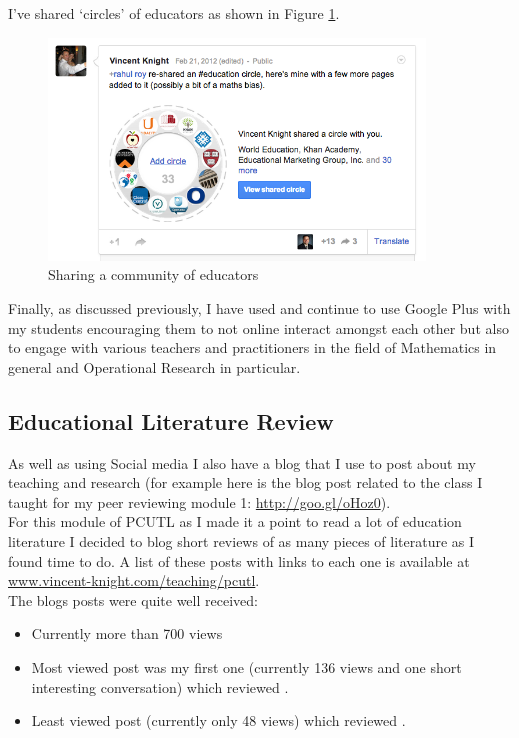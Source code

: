 \documentclass[a4paper,12pt]{article}
\begin{document}
I've shared `circles' of educators as shown in Figure \ref{Sharing_my_education_circle}.\\

\begin{figure}[htdp]
    \begin{center}
        \includegraphics[width=10cm]{images/Sharing_my_education_circle.png}
    \end{center}
    \caption{Sharing a community of educators}
    \label{Sharing_my_education_circle}
\end{figure}

Finally, as discussed previously, I have used and continue to use Google Plus with my students encouraging them to not online interact amongst each other but also to engage with various teachers and practitioners in the field of Mathematics in general and Operational Research in particular.\\

\subsection{Educational Literature Review}

As well as using Social media I also have a blog that I use to post about my teaching and research (for example here is the blog post related to the class I taught for my peer reviewing module 1: \url{http://goo.gl/oHoz0}).\\

For this module of PCUTL as I made it a point to read a lot of education literature I decided to blog short reviews of as many pieces of literature as I found time to do. A list of these posts with links to each one is available at \url{www.vincent-knight.com/teaching/pcutl}.\\

The blogs posts were quite well received:

\begin{itemize}
    \item Currently more than 700 views
    \item Most viewed post was my first one (currently 136 views and one short interesting conversation) which reviewed \cite{Schoenfeld1988}.
    \item Least viewed post (currently only 48 views) which reviewed \cite{Shorser1999}.
\end{itemize}
\end{document}
